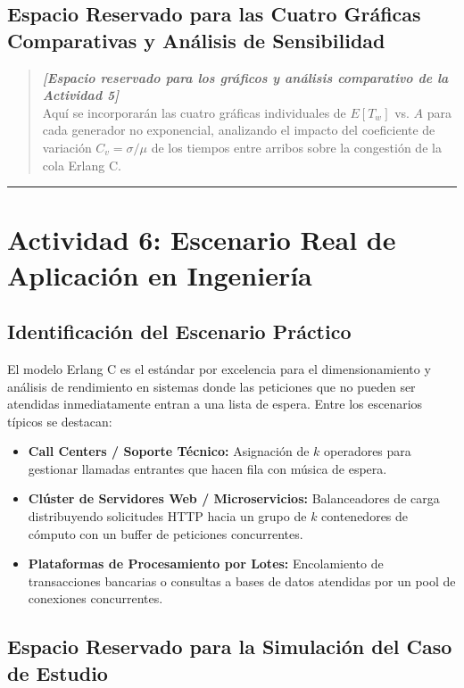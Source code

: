 \documentclass[11pt, a4paper]{article}
\begin{document}
\subsection{Espacio Reservado para las Cuatro Gráficas Comparativas y Análisis de Sensibilidad}

\begin{quote}
\textit{\textbf{[Espacio reservado para los gráficos y análisis comparativo de la Actividad 5]}}\\
Aquí se incorporarán las cuatro gráficas individuales de $E[T_w]$ vs. $A$ para cada generador no exponencial, analizando el impacto del coeficiente de variación $C_v = \sigma / \mu$ de los tiempos entre arribos sobre la congestión de la cola Erlang C.
\end{quote}

\vspace{1em}
\hrule
\vspace{1em}

\section{Actividad 6: Escenario Real de Aplicación en Ingeniería}

\subsection{Identificación del Escenario Práctico}
El modelo Erlang C es el estándar por excelencia para el dimensionamiento y análisis de rendimiento en sistemas donde las peticiones que no pueden ser atendidas inmediatamente entran a una lista de espera. Entre los escenarios típicos se destacan:
\begin{itemize}
    \item \textbf{Call Centers / Soporte Técnico:} Asignación de $k$ operadores para gestionar llamadas entrantes que hacen fila con música de espera.
    \item \textbf{Clúster de Servidores Web / Microservicios:} Balanceadores de carga distribuyendo solicitudes HTTP hacia un grupo de $k$ contenedores de cómputo con un buffer de peticiones concurrentes.
    \item \textbf{Plataformas de Procesamiento por Lotes:} Encolamiento de transacciones bancarias o consultas a bases de datos atendidas por un pool de conexiones concurrentes.
\end{itemize}

\subsection{Espacio Reservado para la Simulación del Caso de Estudio}
\end{document}
